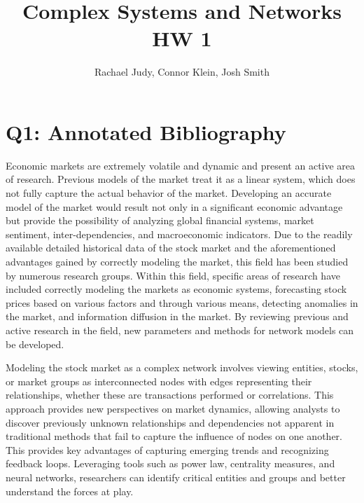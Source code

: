\documentclass[12pt]{article}
\title{Complex Systems and Networks HW 1}
\author{Rachael Judy, Connor Klein, Josh Smith}
\begin{document}
\pgfplotsset{compat=1.18}
 
\maketitle

\section{Q1: Annotated Bibliography}

Economic markets are extremely volatile and dynamic and present an active area of research. Previous models of the market treat it as a linear system, which does not fully capture the actual behavior of the market. Developing an accurate model of the market would result not only in a significant economic advantage but provide the possibility of analyzing global financial systems, market sentiment, inter-dependencies, and macroeconomic indicators. Due to the readily available detailed historical data of the stock market and the aforementioned advantages gained by correctly modeling the market, this field has been studied by numerous research groups. Within this field, specific areas of research have included correctly modeling the markets as economic systems, forecasting stock prices based on various factors and through various means, detecting anomalies in the market, and information diffusion in the market. By reviewing previous and active research in the field, new parameters and methods for network models can be developed.

Modeling the stock market as a complex network involves viewing entities, stocks, or market groups as interconnected nodes with edges representing their relationships, whether these are transactions performed or correlations. This approach provides new perspectives on market dynamics, allowing analysts to discover previously unknown relationships and dependencies not apparent in traditional methods that fail to capture the influence of nodes on one another. This provides key advantages of capturing emerging trends and recognizing feedback loops. Leveraging tools such as power law, centrality measures, and neural networks, researchers can identify critical entities and groups and better understand the forces at play.
\end{document}
